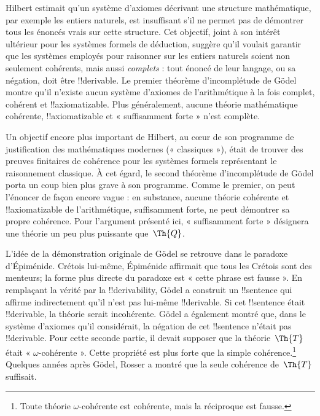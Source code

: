 \documentclass[../../../include/open-logic-section]{subfiles}
\begin{document}


Hilbert estimait qu'un système d'axiomes décrivant
une structure mathématique, par exemple les entiers
naturels, est insuffisant s'il ne permet pas de
démontrer tous les énoncés vrais sur cette structure.
Cet objectif, joint à son intérêt ultérieur pour les
systèmes formels de déduction, suggère qu'il voulait
garantir que les systèmes employés pour raisonner
sur les entiers naturels soient non seulement
cohérents, mais aussi \emph{complets} : tout énoncé
de leur langage, ou sa négation, doit être
!!{derivable}. Le premier théorème d'incomplétude
de Gödel montre qu'il n'existe aucun système
d'axiomes de l'arithmétique à la fois complet,
cohérent et !!{axiomatizable}. Plus généralement,
aucune théorie mathématique cohérente,
!!{axiomatizable} et « suffisamment forte »
n'est complète.

Un objectif encore plus important de Hilbert,
au cœur de son programme de justification des
mathématiques modernes (« classiques »), était de
trouver des preuves finitaires de cohérence pour les
systèmes formels représentant le raisonnement
classique. À cet égard, le second théorème
d'incomplétude de Gödel porta un coup bien plus
grave à son programme. Comme le premier, on peut
l'énoncer de façon encore vague : en substance,
aucune théorie cohérente et !!{axiomatizable} de l'arithmétique,
suffisamment forte, ne peut démontrer sa propre cohérence. Pour l'argument présenté ici,
« suffisamment forte » désignera une théorie
un peu plus puissante que~$\Th{Q}$.

L'idée de la démonstration originale de Gödel se
retrouve dans le paradoxe d'Épiménide. Crétois
lui-même, Épiménide affirmait que tous les Crétois
sont des menteurs; la forme plus directe du paradoxe
est « cette phrase est fausse ». En remplaçant la
vérité par la !!{derivability}, Gödel a construit
un !!{sentence} qui affirme indirectement qu'il
n'est pas lui-même !!{derivable}. Si cet
!!{sentence} était !!{derivable}, la théorie serait
incohérente. Gödel a également montré que, dans le
système d'axiomes qu'il considérait, la négation de
cet !!{sentence} n'était pas !!{derivable}.
Pour cette seconde partie, il devait supposer que
la théorie~$\Th{T}$ était « $\omega$-cohérente ».
Cette propriété est plus forte que la simple
cohérence.\footnote{Toute théorie $\omega$-cohérente
est cohérente, mais la réciproque est fausse.}
Quelques années après Gödel, Rosser a montré que
la seule cohérence de~$\Th{T}$ suffisait.
\end{document}
